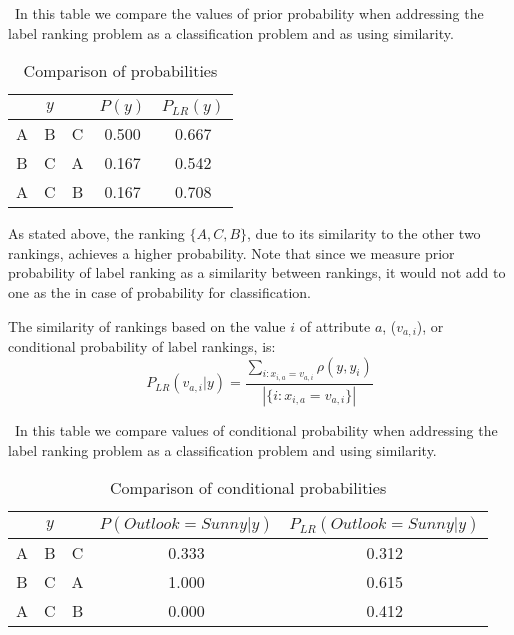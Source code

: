 \begin{table}
\caption{Comparison of probabilities}
\ In this table we compare the values of prior probability when addressing the label ranking problem as a classification problem and as  using similarity.
\begin{center}
\begin{tabular}{ccccc}
\toprule
\multicolumn{3}{c}{$y$}&$P(y)$&$P_{LR}(y)$\\
\midrule
 A & B & C & 0.500 & 0.667 \\ 
  B & C & A & 0.167 & 0.542 \\ 
  A & C & B & 0.167 & 0.708 \\ 
  
\bottomrule
\end{tabular}
\label{ch2-tab02}
\end{center}
\end{table}

As stated above, the ranking $\{A,C,B\}$, due to its  similarity to the other two rankings, achieves a higher probability.  Note that since we measure prior probability of label ranking as a similarity between rankings, it would not add to one as the in case of probability for classification.

The similarity of rankings based on the value $i$ of attribute $a$, ($v_{a,i}$),  or conditional probability of label rankings, is:
\begin{equation}
P_{LR}(v_{a,i}|y)= \frac{\sum_{i: x_{i,a} = v_{a,i}}\rho(y, y_i)}{|\{i: x_{i,a} = v_{a,i}\}|}
\label{ch2-eq:cond}
\end{equation}



\begin{table}
\caption{Comparison of conditional probabilities}
\ In this table we compare  values of conditional probability when addressing the label ranking problem as a classification problem and using similarity.
\begin{center}
 \begin{tabular}{ccccc}
\toprule
\multicolumn{3}{c}{$y$}&$P(Outlook=Sunny|y)$ &$P_{LR}(Outlook=Sunny|y)$\\
\midrule
 A & B & C & 0.333 & 0.312 \\ 
  B & C & A & 1.000 & 0.615 \\ 
  A & C & B & 0.000 & 0.412 \\ 
  
\bottomrule
 \end{tabular}
\label{ch2-tab03}
\end{center}
\end{table}

